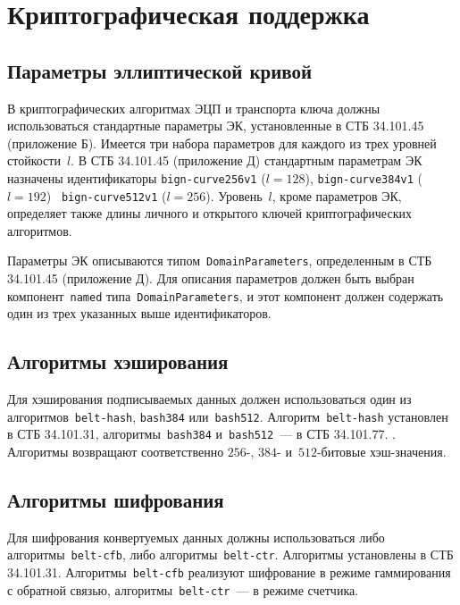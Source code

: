 \chapter{Криптографическая поддержка}\label{CRYPTO}

\section{Параметры эллиптической кривой}\label{CRYPTO.Params}

В криптографических алгоритмах ЭЦП и транспорта ключа должны
использоваться стандартные параметры ЭК, 
установленные в СТБ 34.101.45 (приложение Б). 
%
Имеется три набора параметров для каждого из трех уровней стойкости~$l$.
%
В СТБ 34.101.45 (приложение Д) стандартным параметрам ЭК назначены 
идентификаторы 
\texttt{bign-curve256v1} ($l=128$), 
\texttt{bign-curve384v1} ($l=192$)
~\texttt{bign-curve512v1} ($l=256$).
%
Уровень~$l$, кроме параметров ЭК, определяет также длины личного и 
открытого ключей криптографических алгоритмов.

Параметры ЭК описываются типом~\texttt{DomainParameters},
определенным в СТБ 34.101.45 (приложение Д). Для описания параметров
должен быть выбран компонент~\texttt{named} типа~\texttt{DomainParameters},
и этот компонент должен содержать один из трех указанных выше
идентификаторов.

\section{Алгоритмы хэширования}\label{CRYPTO.Hash}

Для хэширования подписываемых данных должен использоваться один из
алгоритмов~\texttt{belt-hash}, \texttt{bash384} или~\texttt{bash512}.
%
Алгоритм~\texttt{belt-hash} установлен в СТБ 34.101.31,
алгоритмы~\texttt{bash384} и~\texttt{bash512}~--- в СТБ 34.101.77.
%
.
%
Алгоритмы возвращают соответственно $256$-, $384$- 
и~$512$-битовые хэш-значения.

\section{Алгоритмы шифрования}\label{CRYPTO.Encr}

Для шифрования конвертуемых данных должны использоваться либо
алгоритмы~\texttt{belt-cfb}, либо алгоритмы~\texttt{belt-ctr}.
%
Алгоритмы  установлены в СТБ 34.101.31.
%
Алгоритмы~\texttt{belt-cfb} реализуют шифрование в режиме гаммирования с 
обратной связью, алгоритмы~\texttt{belt-ctr}~--- в режиме счетчика.

